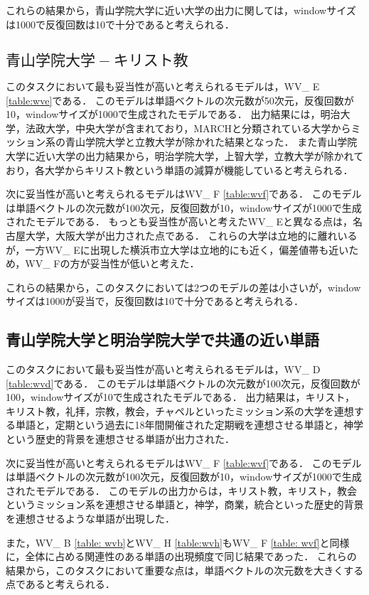 これらの結果から，青山学院大学に近い大学の出力に関しては，windowサイズは1000で反復回数は10で十分であると考えられる．

\subsection{$ 青山学院大学 - キリスト教 $}
このタスクにおいて最も妥当性が高いと考えられるモデルは，WV\_ E \ref{table:wve}である．
このモデルは単語ベクトルの次元数が50次元，反復回数が10，windowサイズが1000で生成されたモデルである．
出力結果には，明治大学，法政大学，中央大学が含まれており，MARCHと分類されている大学からミッション系の青山学院大学と立教大学が除かれた結果となった．
また青山学院大学に近い大学の出力結果から，明治学院大学，上智大学，立教大学が除かれており，各大学からキリスト教という単語の減算が機能していると考えられる．


次に妥当性が高いと考えられるモデルはWV\_ F \ref{table:wvf}である．
このモデルは単語ベクトルの次元数が100次元，反復回数が10，windowサイズが1000で生成されたモデルである．
もっとも妥当性が高いと考えたWV\_ Eと異なる点は，名古屋大学，大阪大学が出力された点である．
これらの大学は立地的に離れいるが，一方WV\_ Eに出現した横浜市立大学は立地的にも近く，偏差値帯も近いため，WV\_ Fの方が妥当性が低いと考えた．

これらの結果から，このタスクにおいては2つのモデルの差は小さいが，windowサイズは1000が妥当で，反復回数は10で十分であると考えられる．

\subsection{青山学院大学と明治学院大学で共通の近い単語}
このタスクにおいて最も妥当性が高いと考えられるモデルは，WV\_ D \ref{table:wvd}である．
このモデルは単語ベクトルの次元数が100次元，反復回数が100，windowサイズが10で生成されたモデルである．
出力結果は，キリスト，キリスト教，礼拝，宗教，教会，チャペルといったミッション系の大学を連想する単語と，定期という過去に18年間開催された定期戦を連想させる単語と，神学という歴史的背景を連想させる単語が出力された．

次に妥当性が高いと考えられるモデルはWV\_ F \ref{table:wvf}である．
このモデルは単語ベクトルの次元数が100次元，反復回数が10，windowサイズが1000で生成されたモデルである．
このモデルの出力からは，キリスト教，キリスト，教会というミッション系を連想させる単語と，神学，商業，統合といった歴史的背景を連想させるような単語が出現した．

また，WV\_ B \ref{table: wvb}とWV\_ H \ref{table:wvh}もWV\_ F \ref{table: wvf}と同様に，全体に占める関連性のある単語の出現頻度で同じ結果であった．
これらの結果から，このタスクにおいて重要な点は，単語ベクトルの次元数を大きくする点であると考えられる．

